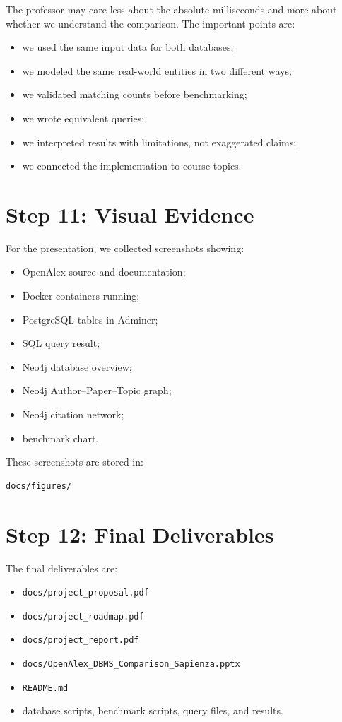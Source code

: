 \documentclass[11pt]{article}
\begin{document}
The professor may care less about the absolute milliseconds and more about whether we understand the comparison.
The important points are:

\begin{itemize}
    \item we used the same input data for both databases;
    \item we modeled the same real-world entities in two different ways;
    \item we validated matching counts before benchmarking;
    \item we wrote equivalent queries;
    \item we interpreted results with limitations, not exaggerated claims;
    \item we connected the implementation to course topics.
\end{itemize}

\section{Step 11: Visual Evidence}

For the presentation, we collected screenshots showing:

\begin{itemize}
    \item OpenAlex source and documentation;
    \item Docker containers running;
    \item PostgreSQL tables in Adminer;
    \item SQL query result;
    \item Neo4j database overview;
    \item Neo4j Author--Paper--Topic graph;
    \item Neo4j citation network;
    \item benchmark chart.
\end{itemize}

These screenshots are stored in:

\begin{verbatim}
docs/figures/
\end{verbatim}

\section{Step 12: Final Deliverables}

The final deliverables are:

\begin{itemize}
    \item \texttt{docs/project\_proposal.pdf}
    \item \texttt{docs/project\_roadmap.pdf}
    \item \texttt{docs/project\_report.pdf}
    \item \texttt{docs/OpenAlex\_DBMS\_Comparison\_Sapienza.pptx}
    \item \texttt{README.md}
    \item database scripts, benchmark scripts, query files, and results.
\end{itemize}
\end{document}
